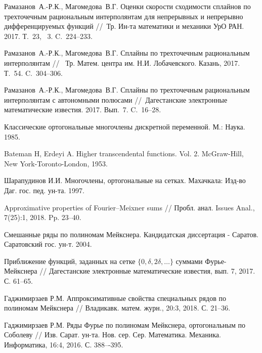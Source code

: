 \begin{thebibliography}{111}
Рамазанов~А.-Р.К., Магомедова~В.Г. Оценки скорости сходимости сплайнов
 по трехточечным рациональным интерполянтам
 для непрерывных и непрерывно дифференцируемых функций
//~Тр. Ин-та математики и механики УрО РАН. 2017. Т.~23, \No~3. C.~224--233.


Рамазанов~А.-Р.К., Магомедова~В.Г.
Сплайны по трехточечным рациональным интерполянтам
//~ Тр. Матем. центра им. Н.И. Лобачевского. Казань, 2017. Т.~54. C.~304--306.


Рамазанов~А.-Р.К., Магомедова~В.Г. Сплайны по трехточечным рациональным
 интерполянтам с автономными полюсами
//~Дагестанские электронные математические известия. 2017. Вып.~7. C.~16--28.






 Классические ортогональные многочлены дискретной переменной. М.: Наука. 1985.

 {Bateman H, Erdeyi A.} Higher transcendental functions. Vol. 2. McGraw-Hill, New York-Toronto-London, 1953.


 {Шарапудинов И.И.} Многочлены, ортогональные на сетках. Махачкала: Изд-во Даг. гос. пед. ун-та. 1997.


 Approximative properties of Fourier–Meixner sums // Пробл. анал. Issues Anal., 7(25):1, 2018. Pp. 23--40.


 Смешанные ряды по полиномам Мейкснера. Кандидатская диссертация - Саратов. Саратовский гос. ун-т. 2004.

 Приближение функций, заданных на сетке $\{0, \delta, 2\delta, \ldots\}$ суммами Фурье-Мейкснера // Дагестанские электронные математические известия, вып. 7, 2017. С. 61--65.


 {Гаджимирзаев Р.М.} Аппроксимативные свойства специальных рядов по полиномам Мейкснера // Владикавк. матем. журн., 20:3, 2018. С. 21--36.

 {Гаджимирзаев Р.М.} Ряды Фурье по полиномам Мейкснера, ортогональным по Соболеву // Изв. Сарат. ун-та. Нов. сер. Сер. Математика. Механика. Информатика, 16:4, 2016. С. 388–-395.















\end{thebibliography}
